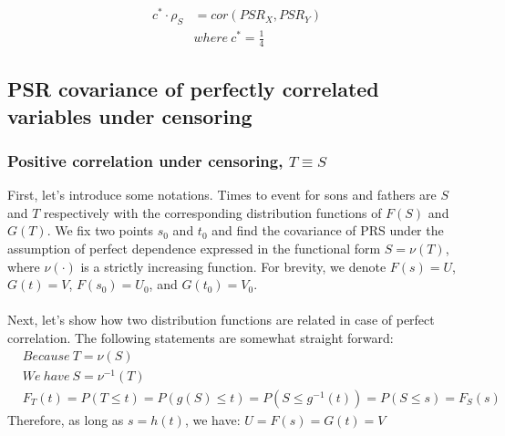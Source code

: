 \documentclass[]{article}
\begin{document}
	$$
	\begin{aligned}
		c^* \cdot \rho_S &= cor(PSR_X, PSR_Y)\\
    & where~c^*=\frac{1}{4}
	\end{aligned}
	$$
  
  

\subsection{PSR covariance of perfectly correlated variables under censoring}
\subsubsection{Positive correlation under censoring, $T\equiv S$}
First, let's introduce some notations. Times to event for sons and fathers are $S$ and $T$ respectively with the corresponding distribution functions of $F(S)$ and $G(T)$. We fix two points $s_0$ and $t_0$ and find the covariance of PRS under the assumption of perfect dependence expressed in the functional form $S =\nu( T)$, where $\nu(\cdot)$ is a strictly increasing function. For brevity, we denote $F(s)=U$, $G(t)=V$, $F(s_0)=U_0$, and $G(t_0)=V_0$.\\
~\\

Next, let's show how two distribution functions are related in case of perfect correlation. The following statements are somewhat straight forward:
	$$
	\begin{aligned}
    &Because~T = \nu(S)\\
    &We~have~S = \nu^{-1}(T)\\
    &F_T(t) = P(T \leq t) = P\left(g(S) \leq t\right) = P(S\leq g^{-1}(t)) = P(S\leq s) = F_S(s) 
	\end{aligned}
	$$
Therefore, as long as $s=h(t)$, we have: $U=F(s) = G(t) = V$
\end{document}
